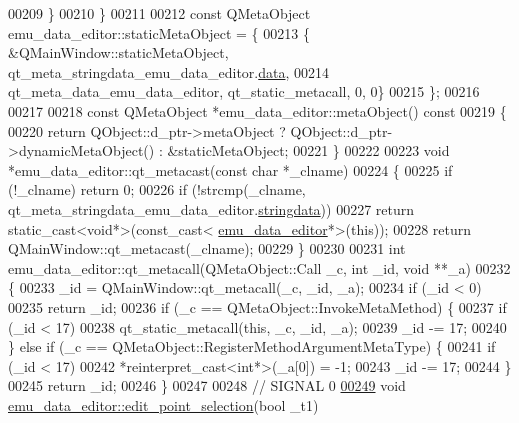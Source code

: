 \begin{DoxyCode}
00209     \}
00210 \}
00211 
00212 \textcolor{keyword}{const} QMetaObject emu\_data\_editor::staticMetaObject = \{
00213     \{ &QMainWindow::staticMetaObject, qt\_meta\_stringdata\_emu\_data\_editor.\hyperlink{a00065_a91db052cb5a1fcce8e53e81902e8e90b}{data},
00214       qt\_meta\_data\_emu\_data\_editor,  qt\_static\_metacall, 0, 0\}
00215 \};
00216 
00217 
00218 \textcolor{keyword}{const} QMetaObject *emu\_data\_editor::metaObject()\textcolor{keyword}{ const}
00219 \textcolor{keyword}{}\{
00220     \textcolor{keywordflow}{return} QObject::d\_ptr->metaObject ? QObject::d\_ptr->dynamicMetaObject() : &staticMetaObject;
00221 \}
00222 
00223 \textcolor{keywordtype}{void} *emu\_data\_editor::qt\_metacast(\textcolor{keyword}{const} \textcolor{keywordtype}{char} *\_clname)
00224 \{
00225     \textcolor{keywordflow}{if} (!\_clname) \textcolor{keywordflow}{return} 0;
00226     \textcolor{keywordflow}{if} (!strcmp(\_clname, qt\_meta\_stringdata\_emu\_data\_editor.\hyperlink{a00065_ae988ab8add535bff49a0c5d5ec714851}{stringdata}))
00227         \textcolor{keywordflow}{return} \textcolor{keyword}{static\_cast<}\textcolor{keywordtype}{void}*\textcolor{keyword}{>}(\textcolor{keyword}{const\_cast<} \hyperlink{a00008}{emu\_data\_editor}*\textcolor{keyword}{>}(\textcolor{keyword}{this}));
00228     \textcolor{keywordflow}{return} QMainWindow::qt\_metacast(\_clname);
00229 \}
00230 
00231 \textcolor{keywordtype}{int} emu\_data\_editor::qt\_metacall(QMetaObject::Call \_c, \textcolor{keywordtype}{int} \_id, \textcolor{keywordtype}{void} **\_a)
00232 \{
00233     \_id = QMainWindow::qt\_metacall(\_c, \_id, \_a);
00234     \textcolor{keywordflow}{if} (\_id < 0)
00235         \textcolor{keywordflow}{return} \_id;
00236     \textcolor{keywordflow}{if} (\_c == QMetaObject::InvokeMetaMethod) \{
00237         \textcolor{keywordflow}{if} (\_id < 17)
00238             qt\_static\_metacall(\textcolor{keyword}{this}, \_c, \_id, \_a);
00239         \_id -= 17;
00240     \} \textcolor{keywordflow}{else} \textcolor{keywordflow}{if} (\_c == QMetaObject::RegisterMethodArgumentMetaType) \{
00241         \textcolor{keywordflow}{if} (\_id < 17)
00242             *\textcolor{keyword}{reinterpret\_cast<}\textcolor{keywordtype}{int}*\textcolor{keyword}{>}(\_a[0]) = -1;
00243         \_id -= 17;
00244     \}
00245     \textcolor{keywordflow}{return} \_id;
00246 \}
00247 
00248 \textcolor{comment}{// SIGNAL 0}
\hypertarget{a00065_source_l00249}{}\hyperlink{a00008_a9aa2af0c329358fd96f7fb6b7f02bfe1}{00249} \textcolor{keywordtype}{void} \hyperlink{a00008_a9aa2af0c329358fd96f7fb6b7f02bfe1}{emu\_data\_editor::edit\_point\_selection}(\textcolor{keywordtype}{bool} \_t1)

\end{DoxyCode}
